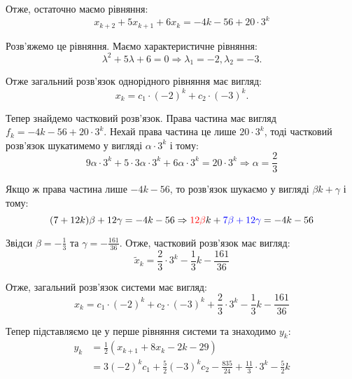 \documentclass{hw_template}
\begin{document}
Отже, остаточно маємо рівняння:
\begin{equation*}
    x_{k+2} + 5x_{k+1} + 6x_k = -4k - 56 + 20 \cdot 3^k
\end{equation*}

Розв'яжемо це рівняння. Маємо характеристичне рівняння:
\begin{equation*}
    \lambda^2 + 5\lambda + 6 = 0 \Rightarrow \lambda_1 = -2, \lambda_2 = -3.
\end{equation*}

Отже загальний розв'язок однорідного рівняння має вигляд:
\begin{equation*}
    x_k = c_1 \cdot (-2)^k + c_2 \cdot (-3)^k.
\end{equation*}

Тепер знайдемо частковий розв'язок. Права частина має вигляд $f_k = -4k - 56 + 20 \cdot 3^k$. Нехай права частина це лише $20 \cdot 3^k$, тоді частковий розв'язок шукатимемо у вигляді $\alpha \cdot 3^k$ і тому:
\begin{equation*}
    9\alpha \cdot 3^k + 5 \cdot 3\alpha \cdot 3^k + 6\alpha \cdot 3^k = 20 \cdot 3^k \Rightarrow \alpha = \frac{2}{3}
\end{equation*}

Якщо ж права частина лише $-4k-56$, то розв'язок шукаємо у вигляді $\beta k + \gamma$ і тому:
\begin{equation*}
    (7+12k)\beta + 12\gamma = -4k - 56 \Rightarrow \textcolor{red}{12\beta}k + \textcolor{blue}{7\beta + 12\gamma} = -4k-56
\end{equation*}

Звідси $\beta=-\frac{1}{3}$ та $\gamma = -\frac{161}{36}$. Отже, частковий розв'язок має вигляд:
\begin{equation*}
    \widetilde{x}_k = \frac{2}{3} \cdot 3^k - \frac{1}{3}k - \frac{161}{36}
\end{equation*}

Отже, загальний розв'язок системи має вигляд:   
\begin{equation*}
    \boxed{x_k = c_1 \cdot (-2)^k + c_2 \cdot (-3)^k + \frac{2}{3} \cdot 3^k - \frac{1}{3}k - \frac{161}{36}}
\end{equation*}

Тепер підставляємо це у перше рівняння системи та знаходимо $y_k$:
\begin{align*}
    y_k &= \frac{1}{2}\left(x_{k+1}+8x_k-2k-29\right) \\
    &= \boxed{3(-2)^k c_1 + \frac{5}{2}(-3)^k c_2 - \frac{835}{24} + \frac{11}{3} \cdot 3^k - \frac{5}{2}k}
\end{align*}
\end{document}
